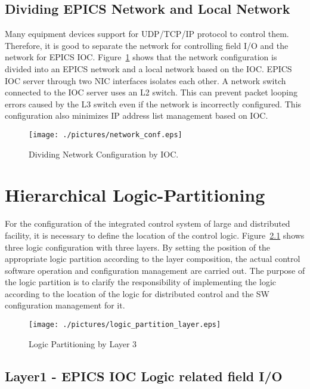 \documentclass[11pt
  , letterpaper
  , article
  , oneside
  , showtrims
]{memoir}
\begin{document}
\section{Dividing EPICS Network and Local Network}
Many equipment devices support for UDP/TCP/IP protocol to control them. Therefore, it is good to separate the network for controlling field I/O and the network for EPICS IOC. Figure~\ref{fig:network_configuration} shows that the network configuration is divided into an EPICS network and a local network based on the IOC. EPICS IOC server through two NIC interfaces isolates each other. A network switch connected to the IOC server uses an L2 switch. This can prevent packet looping errors caused by the L3 switch even if the network is incorrectly configured. This configuration also minimizes IP address list management based on IOC.

\newpage
\begin{figure}[!hbt]
	\centering
	\texttt{[image: ./pictures/network\_conf.eps]}
	\caption{
		Dividing Network Configuration by IOC.
	}
	\label{fig:network_configuration}   
\end{figure}

\chapter{Hierarchical Logic-Partitioning}
For the configuration of the integrated control system of large and distributed facility, it is necessary to define the location of the control logic. Figure~\ref{fig:logic_partition_layer} shows three logic configuration with three layers. By setting the position of the appropriate logic partition according to the layer composition, the actual control software operation and configuration management are carried out. The purpose of the logic partition is to clarify the responsibility of implementing the logic according to the location of the logic for distributed control and the SW configuration management for it.

\begin{figure}[!hbt]
	\centering
	\texttt{[image: ./pictures/logic\_partition\_layer.eps]}
	\caption{
		Logic Partitioning by Layer 3
	}
	\label{fig:logic_partition_layer}   
\end{figure}
\newpage

\section{Layer1 - EPICS IOC Logic related field I/O}
\end{document}
